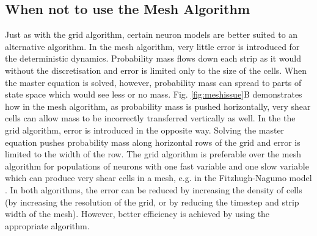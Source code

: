 \documentclass[utf8]{frontiersSCNS} %
\begin{document}
\subsection{When not to use the Mesh Algorithm} 
Just as with the grid algorithm, certain neuron models are better suited to an alternative algorithm. In the mesh algorithm, very little error is introduced for the deterministic dynamics. Probability mass flows down each strip as it would without the discretisation and error is limited only to the size of the cells. When the master equation is solved, however, probability mass can spread to parts of state space which would see less or no mass. Fig. \ref{fig:meshissue}B demonstrates how in the mesh algorithm, as probability mass is pushed horizontally, very shear cells can allow mass to be incorrectly transferred vertically as well. In the the grid algorithm, error is introduced in the opposite way. Solving the master equation pushes probability mass along horizontal rows of the grid and error is limited to the width of the row. The grid algorithm is preferable over the mesh algorithm for populations of neurons with one fast variable and one slow variable which can produce very shear cells in a mesh, e.g. in the Fitzhugh-Nagumo model \citep{de2019computational}. In both algorithms, the error can be reduced by increasing the density of cells (by increasing the resolution of the grid, or by reducing the timestep and strip width of the mesh). However, better efficiency is achieved by using the appropriate algorithm.\\
\end{document}

